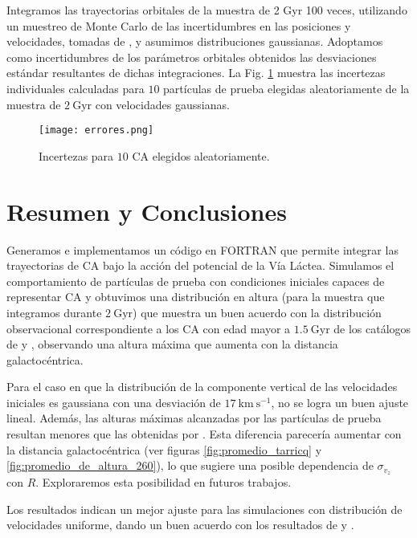 \documentclass[baaa]{baaa}
\begin{document}
Integramos las trayectorias orbitales de la muestra de 2 Gyr 
100 veces, utilizando un muestreo de Monte Carlo de  las incertidumbres en las posiciones y velocidades, tomadas de \cite{Dias}, y asumimos distribuciones gaussianas. Adoptamos como incertidumbres de los parámetros orbitales obtenidos  las desviaciones estándar resultantes de dichas integraciones. La Fig. \ref{fig:errores} muestra las incertezas individuales calculadas para $10$ partículas de prueba elegidas aleatoriamente de la muestra de $2~\mathrm{Gyr}$ con velocidades gaussianas.

\begin{figure}[!h]
    \centering
    \texttt{[image: errores.png]}
    \caption{Incertezas para $10$ CA elegidos aleatoriamente.}
    \label{fig:errores}
\end{figure}

\section{Resumen y Conclusiones}\label{Conclu}

Generamos e implementamos un código en FORTRAN que permite integrar las trayectorias de CA bajo la acción del potencial de la Vía Láctea. Simulamos el comportamiento de partículas de prueba con condiciones iniciales capaces de representar CA y obtuvimos una distribución en altura (para la muestra que integramos durante $2~\mathrm{Gyr}$) que muestra un buen acuerdo con la distribución observacional correspondiente a los CA con edad mayor a $1.5~\mathrm{Gyr}$ de los catálogos de \cite{Dias} y \cite{Tarricq}, observando una altura máxima que aumenta con la distancia galactocéntrica.

Para el caso en que la distribución de la componente vertical de las velocidades iniciales es gaussiana con una desviación de $17~\mathrm{km~s^{-1}}$, no se logra un buen ajuste lineal. Además, las alturas máximas alcanzadas por las partículas de prueba resultan menores que las obtenidas por \cite{Tarricq}. Esta diferencia parecería aumentar con la distancia galactocéntrica (ver figuras \ref{fig:promedio_tarricq} y \ref{fig:promedio_de_altura_260}), lo que sugiere una posible dependencia de $\sigma_{v_z}$ con $R$. Exploraremos esta posibilidad en futuros trabajos. 

Los resultados indican un mejor ajuste para las simulaciones con distribución de velocidades uniforme, dando un buen acuerdo con los resultados de \cite{Dias} y \cite{Tarricq}.
\end{document}
